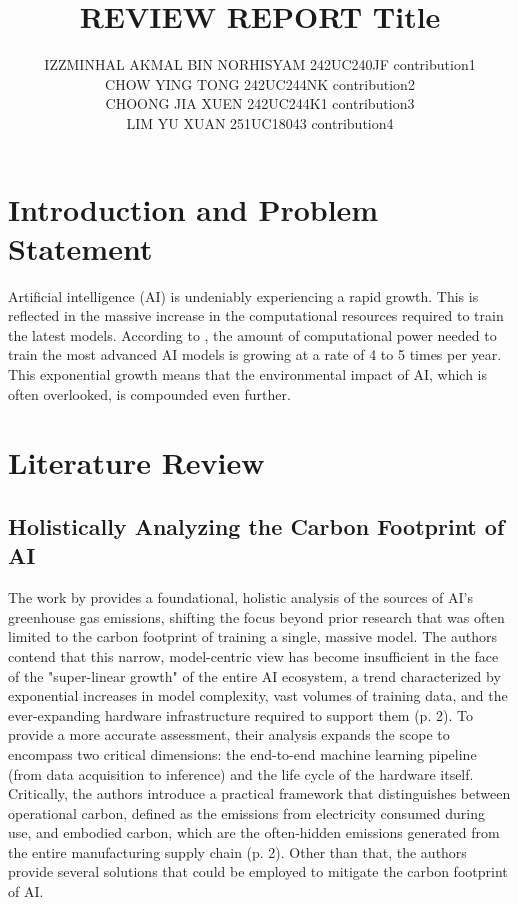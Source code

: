 \documentclass[a4paper, 12pt]{article}
\author{
IZZMINHAL AKMAL BIN NORHISYAM \quad 242UC240JF \quad contribution1 \\
CHOW YING TONG \quad 242UC244NK \quad contribution2\\
CHOONG JIA XUEN \quad 242UC244K1 \quad contribution3\\
LIM YU XUAN \quad 251UC18043 \quad contribution4\\
}
\title{ REVIEW REPORT  Title  }
\begin{document}
\maketitle


\section{Introduction and Problem Statement}
Artificial intelligence (AI) is undeniably experiencing a rapid growth. This is reflected in the massive increase in the computational resources required to train the latest models. According to \citet{Sevilla_Roldan_2024}, the amount of computational power needed to train the most advanced AI models is growing at a rate of 4 to 5 times per year. This exponential growth means that the environmental impact of AI, which is often overlooked, is compounded even further.

\section{Literature Review}
\subsection{Holistically Analyzing the Carbon Footprint of AI}
The work by \citet{Wu2022} provides a foundational, holistic analysis of the sources of AI's greenhouse gas emissions, shifting the focus beyond prior research that was often limited to the carbon footprint of training a single, massive model. The authors contend that this narrow, model-centric view has become insufficient in the face of the "super-linear growth" of the entire AI ecosystem, a trend characterized by exponential increases in model complexity, vast volumes of training data, and the ever-expanding hardware infrastructure required to support them (p. 2). To provide a more accurate assessment, their analysis expands the scope to encompass two critical dimensions: the end-to-end machine learning pipeline (from data acquisition to inference) and the life cycle of the hardware itself. Critically, the authors introduce a practical framework that distinguishes between operational carbon, defined as the emissions from electricity consumed during use, and embodied carbon, which are the often-hidden emissions generated from the entire manufacturing supply chain (p. 2). Other than that, the authors provide several solutions that could be employed to mitigate the carbon footprint of AI.
\end{document}
